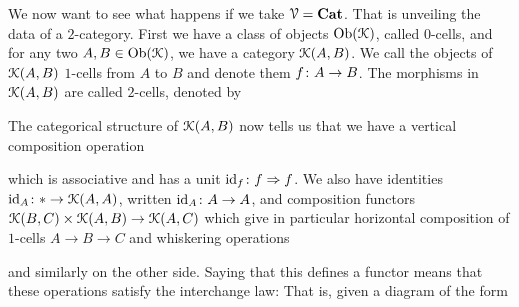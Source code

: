 \documentclass[a4paper,11pt,oneside,openany]{scrbook}
\begin{document}
\begin{exmp}
   We now want to see what happens if we take $\V = \Cat$. That is unveiling the data of a $2$-category. First we have a class of objects 
   $\Ob(\K)$, called $0$-cells, and for any two $A,B \in \Ob(\K)$, we have a category $\K(A,B)$. We call the objects of $\K(A,B)$ $1$-cells from $A$ 
   to $B$ and denote them $f \from A \to B$. The morphisms in $\K(A,B)$ are called $2$-cells, denoted by 
      \begin{center}
      \end{center}
   The categorical structure of $\K(A,B)$ now tells us that we have a vertical composition operation
      \begin{center}
      \end{center}
   which is associative and has a unit $\id_{f} \from f \Rightarrow f$. We also have identities $\id_{A} \from \ast \to \K(A,A)$, written $\id_{A} \from A \to A$, and
   composition functors $\K(B,C) \times \K(A,B) \to \K(A,C)$ which give in particular horizontal composition of $1$-cells $A \to B \to C$ and whiskering operations
      \begin{center}
      \end{center}
   and similarly on the other side. Saying that this defines a functor means that these operations satisfy the interchange law: That is, given a diagram of the 
   form
      \begin{center}
         \begin{tikzcd}

\end{tikzcd}
\end{center}
\end{exmp}
\end{document}
